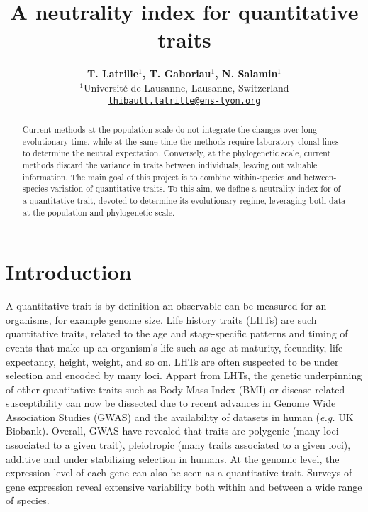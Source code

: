 \documentclass{article}
\title{A neutrality index for quantitative traits}
\author{
\large
\textbf{T. {Latrille}$^{1}$, T. {Gaboriau}$^{1}$, N. {Salamin}$^{1}$}\\
\normalsize
$^{1}$Université de Lausanne, Lausanne, Switzerland\\
\texttt{\href{mailto:thibault.latrille@ens-lyon.org}{thibault.latrille@ens-lyon.org}} \\
}
\begin{document}
\maketitle

\begin{abstract}
    Current methods at the population scale do not integrate the changes over long evolutionary time, while at the same time the methods require laboratory clonal lines to determine the neutral expectation.
    Conversely, at the phylogenetic scale, current methods discard the variance in traits between individuals, leaving out valuable information.
    The main goal of this project is to combine within-species and between-species variation of quantitative traits.
    To this aim, we define a neutrality index for of a quantitative trait, devoted to determine its evolutionary regime, leveraging both data at the population and phylogenetic scale.
\end{abstract}


\section{Introduction}\label{sec:introduction}
A quantitative trait is by definition an observable can be measured for an organisms, for example genome size\cite{alfsnes_genome_2017}.
Life history traits (LHTs) are such quantitative traits, related to the age and stage-specific patterns and timing of events that make up an organism's life such as age at maturity, fecundity, life expectancy, height, weight, and so on.
LHTs are often suspected to be under selection and encoded by many loci.
Appart from LHTs, the genetic underpinning of other quantitative traits such as Body Mass Index (BMI) or disease related susceptibility can now be dissected due to recent advances in Genome Wide Association Studies (GWAS) and the availability of datasets in human (\textit{e.g.} UK Biobank)\cite{simons_population_2018}.
Overall, GWAS have revealed that traits are polygenic (many loci associated to a given trait), pleiotropic (many traits associated to a given loci), additive and under stabilizing selection in humans\cite{sella_thinking_2019}.
At the genomic level, the expression level of each gene can also be seen as a quantitative trait.
Surveys of gene expression reveal extensive variability both within and between a wide range of species\cite{fay_evaluating_2008}.
\end{document}
